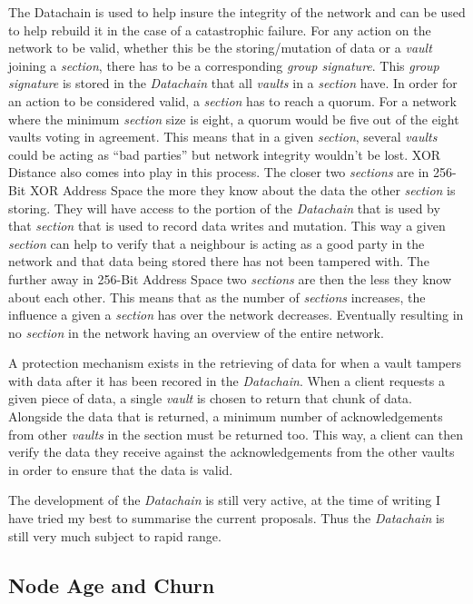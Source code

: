 The Datachain is used to help insure the integrity of the network and can be used to help rebuild it in the case of a catastrophic failure. For any action on the network to be valid, whether this be the storing/mutation of data or a \textit{vault} joining a \textit{section}, there has to be a corresponding \textit{group signature}. This \textit{group signature} is stored in the \textit{Datachain} that all \textit{vaults} in a \textit{section} have. In order for an action to be considered valid, a \textit{section} has to reach a quorum. For a network where the minimum \textit{section} size is eight, a quorum would be five out of the eight vaults voting in agreement. This means that in a given \textit{section}, several \textit{vaults} could be acting as ``bad parties'' but network integrity wouldn't be lost. XOR Distance also comes into play in this process. The closer two \textit{sections} are in 256-Bit XOR Address Space the more they know about the data the other \textit{section} is storing. They will have access to the portion of the \textit{Datachain} that is used by that \textit{section} that is used to record data writes and mutation. This way a given \textit{section} can help to verify that a neighbour is acting as a good party in the network and that data being stored there has not been tampered with. The further away in 256-Bit Address Space two \textit{sections} are then the less they know about each other. This means that as the number of \textit{sections} increases, the influence a given a \textit{section} has over the network decreases. Eventually resulting in no \textit{section} in the network having an overview of the entire network.

A protection mechanism exists in the retrieving of data for when a vault tampers with data after it has been recored in the \textit{Datachain}. When a client requests a given piece of data, a single \textit{vault} is chosen to return that chunk of data. Alongside the data that is returned, a minimum number of acknowledgements from other \textit{vaults} in the section must be returned too. This way, a client can then verify the data they receive against the acknowledgements from the other vaults in order to ensure that the data is valid.

The development of the \textit{Datachain} is still very active, at the time of writing I have tried my best to summarise the current proposals. Thus the \textit{Datachain} is still very much subject to rapid range.

\subsection{Node Age and Churn}

